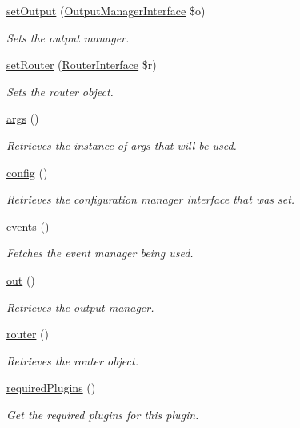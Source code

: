 \begin{DoxyCompactItemize}
\hyperlink{classGenericPlugin_a00fb20d417f3ad2f9839591a84348218}{set\-Output} (\hyperlink{interfaceOutputManagerInterface}{Output\-Manager\-Interface} \$o)
\begin{DoxyCompactList}\small\item\em Sets the output manager. \end{DoxyCompactList}\item 
\hyperlink{classGenericPlugin_ac03553d95ea0e2d5023e3f78ef85f4b9}{set\-Router} (\hyperlink{interfaceRouterInterface}{Router\-Interface} \$r)
\begin{DoxyCompactList}\small\item\em Sets the router object. \end{DoxyCompactList}\item 
\hyperlink{classGenericPlugin_a1ce2fea9e153e37e019ff4b72fd3b819}{args} ()
\begin{DoxyCompactList}\small\item\em Retrieves the instance of args that will be used. \end{DoxyCompactList}\item 
\hyperlink{classGenericPlugin_aa7c4a335f37ee83cd131be29ed469c82}{config} ()
\begin{DoxyCompactList}\small\item\em Retrieves the configuration manager interface that was set. \end{DoxyCompactList}\item 
\hyperlink{classGenericPlugin_ab7d46f8bdaf1540eee1b988073294298}{events} ()
\begin{DoxyCompactList}\small\item\em Fetches the event manager being used. \end{DoxyCompactList}\item 
\hyperlink{classGenericPlugin_a005937e2c819abbb56fdc4b10fdeb666}{out} ()
\begin{DoxyCompactList}\small\item\em Retrieves the output manager. \end{DoxyCompactList}\item 
\hyperlink{classGenericPlugin_adc6c23c436e9979ed2c5b07dde6f3931}{router} ()
\begin{DoxyCompactList}\small\item\em Retrieves the router object. \end{DoxyCompactList}\item 
\hyperlink{classGenericPlugin_a32850f8424953482ef2b07df130941cf}{required\-Plugins} ()
\begin{DoxyCompactList}\small\item\em Get the required plugins for this plugin. \end{DoxyCompactList}\end{DoxyCompactItemize}
